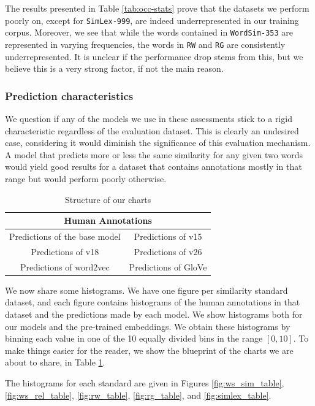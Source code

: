 The results presented in Table \ref{tab:occ-stats} prove that the datasets we perform poorly on, except for \verb|SimLex-999|, are indeed underrepresented in our training corpus. Moreover, we see that while the words contained in \verb|WordSim-353| are represented in varying frequencies, the words in \verb|RW| and \verb|RG| are consistently underrepresented. It is unclear if the performance drop stems from this, but we believe this is a very strong factor, if not the main reason.

\subsubsection{Prediction characteristics}

We question if any of the models we use in these assessments stick to a rigid characteristic regardless of the evaluation dataset. This is clearly an undesired case, considering it would diminish the significance of this evaluation mechanism. A model that predicts more or less the same similarity for any given two words would yield good results for a dataset that contains annotations mostly in that range but would perform poorly otherwise. 

\begin{table}[ht]
\centering
\begin{tabular}{|cc|}
\hline
\multicolumn{2}{|c|}{Human Annotations} \\ \hline
\multicolumn{1}{|c|}{Predictions of the base model} & Predictions of v15 \\ \hline
\multicolumn{1}{|c|}{Predictions of v18} & Predictions of v26 \\ \hline
\multicolumn{1}{|c|}{Predictions of word2vec} & Predictions of GloVe \\ \hline
\end{tabular}
\caption{Structure of our charts}
\label{tab:str_charts}
\end{table}

We now share some histograms. We have one figure per similarity standard dataset, and each figure contains histograms of the human annotations in that dataset and the predictions made by each model. We show histograms both for our models and the pre-trained embeddings. We obtain these histograms by binning each value in one of the 10 equally divided bins in the range $[0, 10]$. To make things easier for the reader, we show the blueprint of the charts we are about to share, in Table \ref{tab:str_charts}. 

The histograms for each standard are given in Figures \ref{fig:ws_sim_table}, \ref{fig:ws_rel_table}, \ref{fig:rw_table}, \ref{fig:rg_table}, and \ref{fig:simlex_table}.

